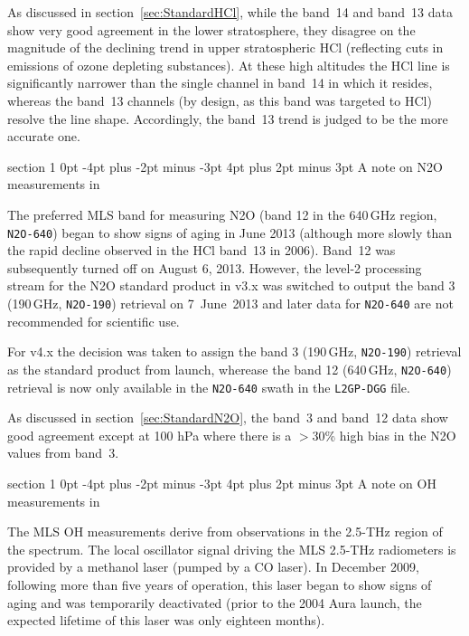 \documentclass[11pt,draft]{report}
\makeatletter
\renewcommand{\section}{\@startsection%
  {section}%
  {1}%
  {0pt}%
  {-4pt plus -2pt minus -3pt}%
  {4pt plus 2pt minus 3pt}%
  {\Large\sffamily\fontseries{sb}\selectfont\flushleft\color{SectionColor}\figureversion{tabular}}}%
\makeatother
\begin{document}
As discussed in section~\ref{sec:StandardHCl}, while the band~14 and
band~13 data show very good agreement in the lower stratosphere, they
disagree on the magnitude of the declining trend in upper stratospheric
HCl (reflecting cuts in emissions of ozone depleting substances).  At
these high altitudes the HCl line is significantly narrower than the
single channel in band~14 in which it resides, whereas the band~13
channels (by design, as this band was targeted to HCl) resolve the line
shape.  Accordingly, the band~13 trend is judged to be the more accurate
one.

\section{A note on N\cs2O measurements in \thisv}

The preferred MLS band for measuring N\cs2O (band 12 in the 640\,GHz
region, \texttt{N2O-640}) began to show signs of aging in June 2013
(although more slowly than the rapid decline observed in the HCl band~13
in 2006). Band~12 was subsequently turned off on August 6,
2013. However, the level-2 processing stream for the N\cs2O standard
product in v3.x was switched to output the band 3 (190\,GHz,
\texttt{N2O-190}) retrieval on 7~June~2013 and later data for
\texttt{N2O-640} are not recommended for scientific use.

For v4.x the decision was taken to assign the band 3 (190\,GHz,
\texttt{N2O-190}) retrieval as the standard product from launch,
wherease the band 12 (640\,GHz, \texttt{N2O-640}) retrieval is now only
available in the \texttt{N2O-640} swath in the \texttt{L2GP-DGG} file.

As discussed in section~\ref{sec:StandardN2O}, the band~3 and band~12
data show good agreement except at 100 hPa where there is a $>$30\% high
bias in the N\cs2O values from band~3.

\section{A note on OH measurements in \thisv}
\label{sec:OHNote}

The MLS OH measurements derive from observations in the 2.5-THz region
of the spectrum. The local oscillator signal driving the MLS 2.5-THz
radiometers is provided by a methanol laser (pumped by a CO
laser). In December 2009, following more than five years of operation,
this laser began to show signs of aging and was temporarily deactivated
(prior to the 2004 Aura launch, the expected lifetime of this laser was
only eighteen months).
\end{document}
